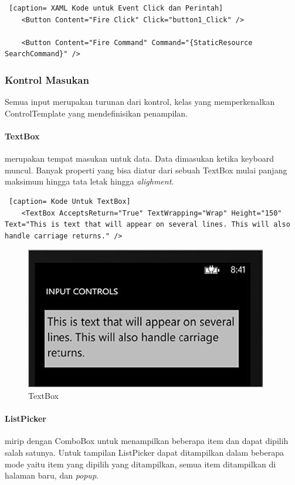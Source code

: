 \begin{lstlisting} [caption= XAML Kode untuk Event Click dan Perintah]
	<Button Content="Fire Click" Click="button1_Click" />
	
	<Button Content="Fire Command" Command="{StaticResource SearchCommand}" />
\end{lstlisting}
	
\subsubsection{Kontrol Masukan}
\label{subsubsec:Kontrol Masukan}
\hspace{0.5cm} Semua input merupakan turunan dari kontrol, kelas yang memperkenalkan ControlTemplate yang mendefinisikan penampilan.

\paragraph{TextBox}
\label{subsubsec:TextBox}
merupakan tempat masukan untuk data. Data dimasukan ketika keyboard muncul. Banyak properti yang bisa diatur dari sebuah TextBox mulai panjang maksimum hingga tata letak hingga \textit{alighment}.

\begin{lstlisting} [caption= Kode Untuk TextBox]
	<TextBox AcceptsReturn="True" TextWrapping="Wrap" Height="150"
Text="This is text that will appear on several lines. This will also handle carriage returns." />
\end{lstlisting}

\begin{figure}[h]
	\centering
		\includegraphics{Gambar/textbox.jpg}
	\caption{TextBox}
	\label{fig:textbox}
\end{figure}

\paragraph{ListPicker}
\label{subsubsec:ListPicker}
\vspace{0.5cm}
mirip dengan ComboBox untuk menampilkan beberapa item dan dapat dipilih salah satunya. Untuk tampilan ListPicker dapat ditampilkan dalam beberapa mode yaitu item yang dipilih yang ditampilkan, semua item ditampilkan di halaman baru, dan \textit{popup}.

